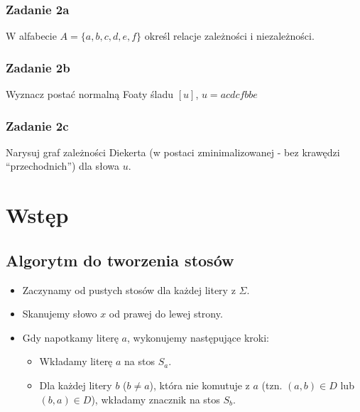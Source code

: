 \documentclass[11pt]{article}
\providecommand{\tightlist}{%
      \setlength{\itemsep}{0pt}\setlength{\parskip}{0pt}}
\begin{document}
\hypertarget{zadanie-2a}{%
\subsubsection{Zadanie 2a}\label{zadanie-2a}}

W alfabecie \(A = \{a, b, c, d, e, f\}\) określ relacje zależności i
niezależności.

\hypertarget{zadanie-2b}{%
\subsubsection{Zadanie 2b}\label{zadanie-2b}}

Wyznacz postać normalną Foaty śladu \([u]\), \(u = acdcfbbe\)

\hypertarget{zadanie-2c}{%
\subsubsection{Zadanie 2c}\label{zadanie-2c}}

Narysuj graf zależności Diekerta (w postaci zminimalizowanej - bez
krawędzi ``przechodnich'') dla słowa \(u\).

    \hypertarget{wstux119p}{%
\section{Wstęp}\label{wstux119p}}

    \hypertarget{algorytm-do-tworzenia-stosuxf3w}{%
\subsection{Algorytm do tworzenia
stosów}\label{algorytm-do-tworzenia-stosuxf3w}}

\begin{itemize}
\item
  Zaczynamy od pustych stosów dla każdej litery z \(\Sigma\).
\item
  Skanujemy słowo \(x\) od prawej do lewej strony.
\item
  Gdy napotkamy literę \(a\), wykonujemy następujące kroki:

  \begin{itemize}
  \tightlist
  \item
    Wkładamy literę \(a\) na stos \(S_a\)\hspace{0pt}.
  \item
    Dla każdej litery \(b\) (\(b \ne a\)), która nie komutuje z \(a\)
    (tzn. \((a, b) \in D\) lub \((b, a) \in D\)), wkładamy znacznik na
    stos \(S_b\)\hspace{0pt}.
  \end{itemize}
\end{itemize}
\end{document}
